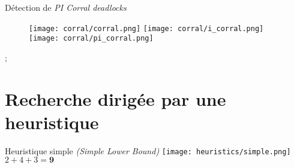             \begin{frame}{Détection de \textit{PI Corral deadlocks}}
                 {
                    \begin{figure}
                        \centering
                         {
                            \texttt{[image: corral/corral.png]}%
                        }
                         {
                            \texttt{[image: corral/i\_corral.png]}%
                        }
                         {
                            \texttt{[image: corral/pi\_corral.png]}%
                        }
                    \end{figure}
                }
            \end{frame}

            \begin{interstateframe}
                \begin{interstatenv}{6}{4};\end{interstatenv}
            \end{interstateframe}

    \section{Recherche dirigée par une heuristique}
        \begin{frame}{Heuristique simple \textit{(Simple Lower Bound)}}
            \centering%
            \texttt{[image: heuristics/simple.png]}
            \Large$\boxed{2 + 4 + 3 = \mathbf{9}}$
        \end{frame}

